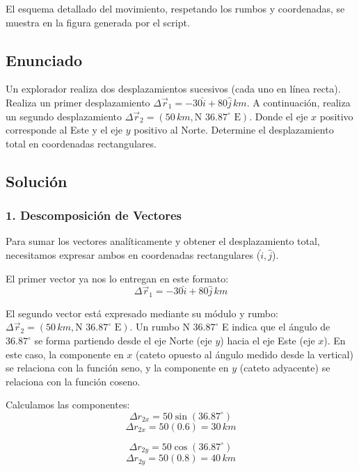 \documentclass[12pt, a4paper]{article}
\begin{document}
\begin{tcolorbox}[colback=green!5!white, colframe=green!50!black, title=Respuesta Final]
\centering El esquema detallado del movimiento, respetando los rumbos y coordenadas, se muestra en la figura generada por el script.
\end{tcolorbox}

\newpage

\subsection*{Enunciado}
Un explorador realiza dos desplazamientos sucesivos (cada uno en línea recta). Realiza un primer desplazamiento $\Delta\vec{r}_1 = -30\hat{i} + 80\hat{j} \, \si{km}$. A continuación, realiza un segundo desplazamiento $\Delta\vec{r}_2 = (50 \, \si{km}, \text{N } 36.87^\circ \text{ E})$. Donde el eje $x$ positivo corresponde al Este y el eje $y$ positivo al Norte. Determine el desplazamiento total en coordenadas rectangulares.

\subsection*{Solución}

\subsubsection*{1. Descomposición de Vectores}
Para sumar los vectores analíticamente y obtener el desplazamiento total, necesitamos expresar ambos en coordenadas rectangulares ($\hat{i}, \hat{j}$).

El primer vector ya nos lo entregan en este formato:
$$ \Delta\vec{r}_1 = -30\hat{i} + 80\hat{j} \, \si{km} $$

El segundo vector está expresado mediante su módulo y rumbo: $\Delta\vec{r}_2 = (50 \, \si{km}, \text{N } 36.87^\circ \text{ E})$.
Un rumbo N $36.87^\circ$ E indica que el ángulo de $36.87^\circ$ se forma partiendo desde el eje Norte (eje $y$) hacia el eje Este (eje $x$).
En este caso, la componente en $x$ (cateto opuesto al ángulo medido desde la vertical) se relaciona con la función seno, y la componente en $y$ (cateto adyacente) se relaciona con la función coseno.

Calculamos las componentes:
$$ \Delta r_{2x} = 50 \sin(36.87^\circ) $$
$$ \Delta r_{2x} = 50 (0.6) = 30 \, \si{km} $$

$$ \Delta r_{2y} = 50 \cos(36.87^\circ) $$
$$ \Delta r_{2y} = 50 (0.8) = 40 \, \si{km} $$
\end{document}

